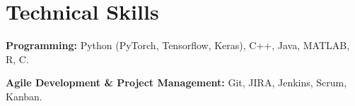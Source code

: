 \documentclass[letterpaper]{article}
\renewenvironment{itemize}{
  \begin{list}{}{
    \setlength{\leftmargin}{1.5em}
  }
}{
  \end{list}
}
\begin{document}
\section*{Technical Skills}
\begin{itemize}
    \item \textbf{Programming:} Python (PyTorch, Tensorflow, Keras), C++, Java, MATLAB, R, C.
    \item \textbf{Agile Development \& Project Management:} Git, JIRA, Jenkins, Scrum, Kanban.
\end{itemize}

\iffalse
\section*{Extracurricular Activities}
\begin{itemize}
    \item Music: bass guitar, guitar, clarinet, ukulele, guitalele.
    \item Sports: windsurfing, tennis, squash, running, hiking.
    \item Dance: salsa (in progress), cretan folk.
    \item Photography: dslr, mobile.
\end{itemize}

\section*{Languages}
\begin{itemize}
    \item English (fluent), French (intermediate), Greek (native), Spanish (beginner).
\end{itemize}
\fi
\end{document}
